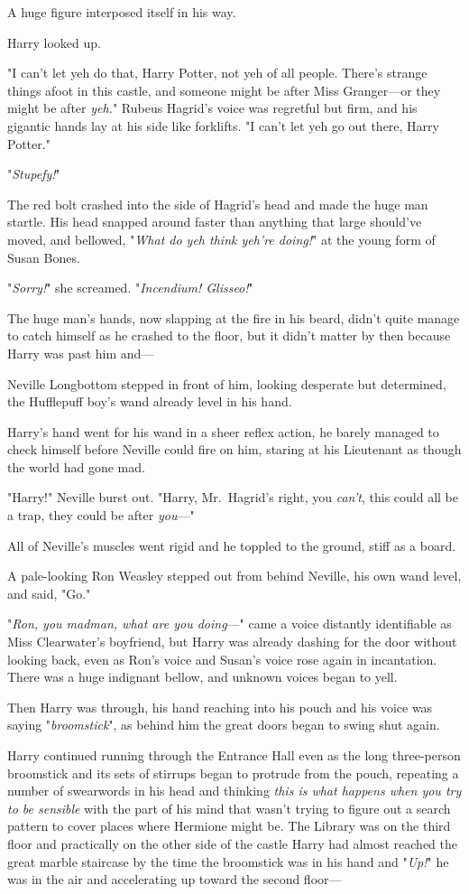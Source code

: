 A huge figure interposed itself in his way.

Harry looked up.

"I can't let yeh do that, Harry Potter, not yeh of all people. There's strange
things afoot in this castle, and someone might be after Miss Granger—or they
might be after \emph{yeh.}" Rubeus Hagrid's voice was regretful but firm, and
his gigantic hands lay at his side like forklifts. "I can't let yeh go out
there, Harry Potter."

"\emph{Stupefy!}"

The red bolt crashed into the side of Hagrid's head and made the huge man
startle. His head snapped around faster than anything that large should've
moved, and bellowed, "\emph{What do yeh think yeh're doing!}" at the young form
of Susan Bones.

"\emph{Sorry!}" she screamed. "\emph{Incendium! Glisseo!}"

The huge man's hands, now slapping at the fire in his beard, didn't quite
manage to catch himself as he crashed to the floor, but it didn't matter by
then because Harry was past him and—

Neville Longbottom stepped in front of him, looking desperate but determined,
the Hufflepuff boy's wand already level in his hand.

Harry's hand went for his wand in a sheer reflex action, he barely managed to
check himself before Neville could fire on him, staring at his Lieutenant as
though the world had gone mad.

"Harry!" Neville burst out. "Harry, Mr.~Hagrid's right, you \emph{can't}, this
could all be a trap, they could be after \emph{you}—"

All of Neville's muscles went rigid and he toppled to the ground, stiff as a
board.

A pale-looking Ron Weasley stepped out from behind Neville, his own wand level,
and said, "Go."

"\emph{Ron, you madman, what are you doing}—" came a voice distantly
identifiable as Miss Clearwater's boyfriend, but Harry was already dashing for
the door without looking back, even as Ron's voice and Susan's voice rose again
in incantation. There was a huge indignant bellow, and unknown voices began to
yell.

Then Harry was through, his hand reaching into his pouch and his voice was
saying "\emph{broomstick}", as behind him the great doors began to swing shut
again.

Harry continued running through the Entrance Hall even as the long three-person
broomstick and its sets of stirrups began to protrude from the pouch, repeating
a number of swearwords in his head and thinking \emph{this is what happens when
you try to be sensible} with the part of his mind that wasn't trying to figure
out a search pattern to cover places where Hermione might be. The Library was
on the third floor and practically on the other side of the castle{\el}
Harry had almost reached the great marble staircase by the time the broomstick
was in his hand and "\emph{Up!}" he was in the air and accelerating up toward
the second floor—

